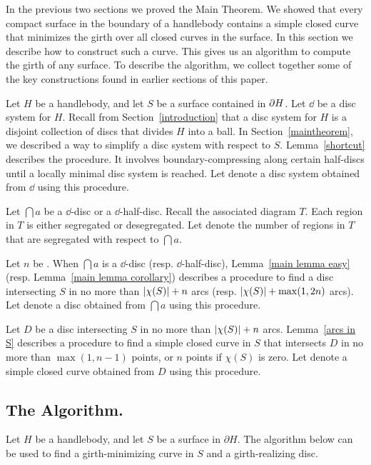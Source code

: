In the previous two sections we proved the Main Theorem.  We showed that every compact surface in the boundary of a handlebody contains a simple closed curve that minimizes the girth over all closed curves in the surface.  In this section we describe how to construct such a curve.  This gives us an algorithm to compute the girth of any surface.  To describe the algorithm, we collect together some of the key constructions found in earlier sections of this paper.

Let $H$ be a handlebody, and let $S$ be a surface contained in 
$\partial H$.  Let $\dd$ be a disc system for $H$.  Recall from 
Section~\ref{introduction} that a disc system for $H$ is a disjoint
collection of discs that divides $H$ into a ball.  In 
Section~\ref{maintheorem}, we described a way to simplify
a disc system with respect to $S$.  Lemma~\ref{shortcut} describes 
the procedure.  It involves boundary-compressing along certain half-discs
until a locally minimal disc system is reached.
Let \locallyminimize{$\dd$} denote a disc system obtained 
from $\dd$ using this procedure.

Let $\dint{a}$ be a $\dd$-disc or a $\dd$-half-disc.  
Recall the associated diagram $T$.  Each region in $T$ is 
either segregated or desegregated.  
Let  denote the number of regions in $T$ that
are segregated with respect to $\dint{a}$.

Let $n$ be .
When $\dint{a}$ is a $\dd$-disc (resp. $\dd$-half-disc),
Lemma~\ref{main lemma easy} (resp. Lemma~\ref{main lemma corollary})
describes a procedure to find a disc intersecting $S$ in no more
than $| \chi (S) |+n$ arcs (resp. $| \chi (S) |+\max(1,2n)$ arcs).
Let  denote a disc obtained from $\dint{a}$ using 
this procedure.

Let $D$ be a disc intersecting $S$ in no more than $| \chi (S) |+n$ arcs.
Lemma~\ref{arcs in S} describes a procedure to find a simple
closed curve in $S$ that intersects $D$ in no more than $\max(1,n-1)$ 
points, or $n$ points if $\chi(S)$ is zero.  
Let  denote a simple closed curve obtained from $D$
using this procedure.

\subsection{The Algorithm.}
\label{surface algorithm}
Let $H$ be a handlebody, and let $S$ be a surface in $\partial H$.  
The algorithm below can be used to find a girth-minimizing curve in $S$
and a girth-realizing disc.

